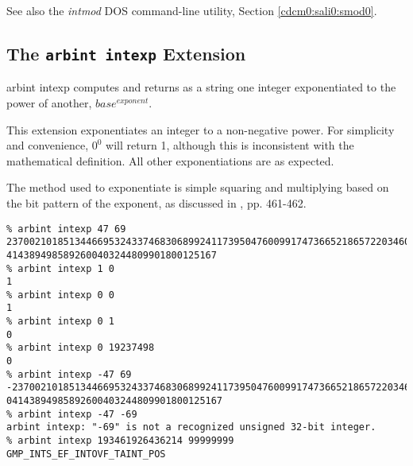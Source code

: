 \begin{tclcommandseealso}
See also the \emph{intmod} DOS command-line utility, 
Section \cdcmzeroxrefhyphen{}\ref{cdcm0:sali0:smod0}.
\end{tclcommandseealso}


\subsection{The \texttt{arbint intexp} Extension}
\label{cxtn0:sarb0:sixp0}

\begin{tclcommandname}{arbint intexp}%
computes and returns as a string one integer
exponentiated to the power of another, 
$base^{exponent}$.

\end{tclcommandname}

\begin{tclcommandsynopsis}
\end{tclcommandsynopsis}

\begin{tclcommanddescription}
This extension exponentiates an integer to a non-negative
power.  For
simplicity and convenience, $0^0$ will return 1, although
this is inconsistent with the mathematical definition.
All other exponentiations are as expected.

The method used to exponentiate is simple squaring and multiplying
based on the bit pattern of the exponent, as discussed 
in \cite{bibref:b:knuthclassic2ndedvol2}, pp. 461-462.
\end{tclcommanddescription}

\begin{tclcommandsampleinvocations}
\begin{scriptsize}
\begin{verbatim}
% arbint intexp 47 69
2370021018513446695324337468306899241173950476009917473665218657220346081293500
4143894985892600403244809901800125167
% arbint intexp 1 0
1
% arbint intexp 0 0
1
% arbint intexp 0 1
0
% arbint intexp 0 19237498
0
% arbint intexp -47 69
-237002101851344669532433746830689924117395047600991747366521865722034608129350
04143894985892600403244809901800125167
% arbint intexp -47 -69
arbint intexp: "-69" is not a recognized unsigned 32-bit integer.
% arbint intexp 193461926436214 99999999
GMP_INTS_EF_INTOVF_TAINT_POS
\end{verbatim}
\end{scriptsize}
\end{tclcommandsampleinvocations}

